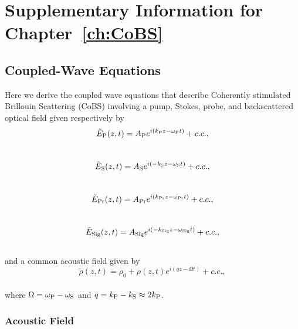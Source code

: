 \doublespacing
\chapter{Supplementary Information for Chapter~\ref{ch:CoBS}}
\label{appendix: CoBS}
\acresetall


\section{Coupled-Wave Equations}
\label{Appendix:Coupled-Wave Equations}

Here we derive the coupled wave equations that describe Coherently stimulated Brillouin Scattering (\acs{CoBS}) involving a pump, Stokes, probe, and backscattered optical field given respectively by
\\
\begin{equation}
    \tilde{E}_{\rm P}(z,t) = A_{\rm P}e^{i(k_{\rm P}z - \omega_{\rm P}t)} + c.c.,
    \label{eq:Pump optical field}
\end{equation}
\\
\begin{equation}
    \tilde{E}_{\rm S}(z,t) = A_{\rm S}e^{i(-k_{\rm S}z - \omega_{\rm S}t)} + c.c.,
    \label{eq:Stokes optical field}
\end{equation}
\\
\begin{equation}
    \tilde{E}_{\rm Pr}(z,t) = A_{\rm Pr}e^{i(k_{\rm Pr}z - \omega_{\rm Pr}t)} + c.c.,
    \label{eq:Probe optical field}
\end{equation}
\\
\begin{equation}
    \tilde{E}_{\rm Sig}(z,t) = A_{\rm Sig}e^{i(-k_{\rm Sig}z - \omega_{\rm Sig}t)} + c.c.,
    \label{eq:Signal optical field}
\end{equation}
\\
\noindent and a common acoustic field given by
\\
\begin{equation}
    \tilde{\rho}(z,t) = \rho_{0} + \rho(z,t)e^{i(qz - \Omega t)} + c.c.,
    \label{eq:acoustic field}
\end{equation}
\\
\noindent where \(\Omega = \omega_{\rm P} - \omega_{\rm S}\) and \(q = k_{\rm P} - k_{\rm S} \approx 2k_{\rm P}\).


\subsection{Acoustic Field}
\label{Coupled-Wave Equations:Acoustic Field}

